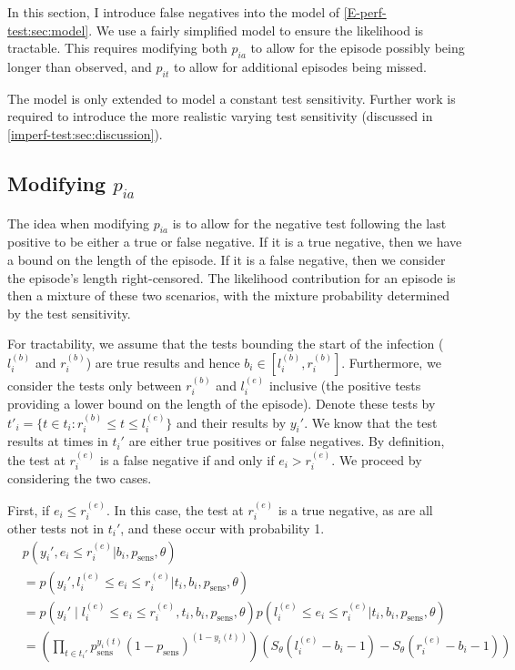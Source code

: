 \documentclass[thesis.tex]{subfiles}
\begin{document}
In this section, I introduce false negatives into the model of \cref{E-perf-test:sec:model}.
We use a fairly simplified model to ensure the likelihood is tractable.
This requires modifying both $p_{ia}$ to allow for the episode possibly being longer than observed, and $p_{it}$ to allow for additional episodes being missed.

The model is only extended to model a constant test sensitivity.
Further work is required to introduce the more realistic varying test sensitivity (discussed in \cref{imperf-test:sec:discussion}).

\subsection{Modifying \texorpdfstring{$p_{ia}$}{pia}} \label{modifying-p_ia}

The idea when modifying $p_{ia}$ is to allow for the negative test following the last positive to be either a true or false negative.
If it is a true negative, then we have a bound on the length of the episode.
If it is a false negative, then we consider the episode's length right-censored.
The likelihood contribution for an episode is then a mixture of these two scenarios, with the mixture probability determined by the test sensitivity.

For tractability, we assume that the tests bounding the start of the infection ($l_i^{(b)}$ and $r_i^{(b)}$) are true results and hence $b_i \in [l_i^{(b)}, r_i^{(b)}]$.
Furthermore, we consider the tests only between $r_i^{(b)}$ and $l_i^{(e)}$ inclusive (the positive tests providing a lower bound on the length of the episode).
Denote these tests by $t'_i = \{ t \in t_i : r_i^{(b)} \leq t \leq l_i^{(e)} \}$ and their results by $y_i'$.
We know that the test results at times in $t_i'$ are either true positives or false negatives. 
By definition, the test at $r_i^{(e)}$ is a false negative if and only if $e_i > r_i^{(e)}$.
We proceed by considering the two cases.

First, if $e_i \leq r_i^{(e)}$.
In this case, the test at $r_i^{(e)}$ is a true negative, as are all other tests not in $t_i'$, and these occur with probability 1.
\begin{align}
&p(y_i', e_i \leq r_i^{(e)} | b_i, p_\text{sens}, \theta) \\
&= p(y_i', l_i^{(e)} \leq e_i \leq r_i^{(e)} | t_i, b_i, p_\text{sens}, \theta) \\ %
&= p(y_i' \mid l_i^{(e)} \leq e_i \leq r_i^{(e)}, t_i, b_i, p_\text{sens}, \theta) p(l_i^{(e)} \leq e_i \leq r_i^{(e)} | t_i, b_i, p_\text{sens}, \theta) \\
&= \left( \prod_{t \in t_i'} p_\text{sens}^{y_i(t)} (1 - p_\text{sens})^{(1 - y_i(t))} \right) \left( S_\theta(l_i^{(e)} - b_i - 1) - S_\theta(r_i^{(e)} - b_i - 1) \right)
\end{align}
\end{document}
